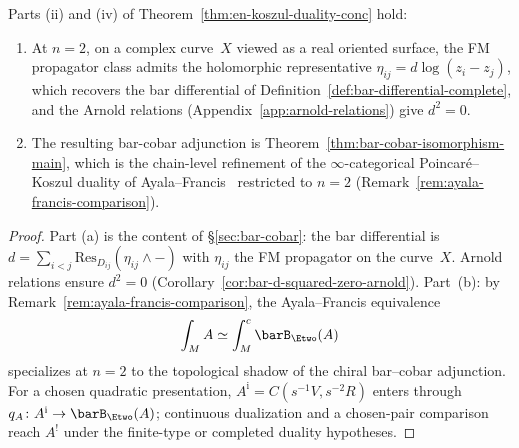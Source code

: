\begin{proposition}[\texorpdfstring{$n = 2$}{n = 2} recovery and AF comparison;
\ClaimStatusConditional]\label{prop:en-n2-recovery}
Parts \textup{(ii)} and \textup{(iv)} of
Theorem~\textup{\ref{thm:en-koszul-duality-conc}} hold:
\begin{enumerate}[label=\textup{(\alph*)}]
\item At $n = 2$, on a complex curve~$X$ viewed as a real oriented
 surface, the FM propagator class admits the holomorphic
 representative $\eta_{ij} = d\log(z_i - z_j)$, which
 recovers the bar differential of
 Definition~\textup{\ref{def:bar-differential-complete}},
 and the Arnold relations
 \textup{(}Appendix~\textup{\ref{app:arnold-relations})} give $d^2 = 0$.
\item The resulting bar-cobar adjunction is
 Theorem~\textup{\ref{thm:bar-cobar-isomorphism-main}},
 which is the chain-level refinement of the $\infty$-categorical
 Poincar\'e--Koszul duality of Ayala--Francis~\cite{AF15}
 restricted to $n = 2$
 \textup{(}Remark~\textup{\ref{rem:ayala-francis-comparison})}.
\end{enumerate}
\end{proposition}

\begin{proof}
Part (a) is the content of \S\ref{sec:bar-cobar}: the
bar differential is $d = \sum_{i < j} \mathrm{Res}_{D_{ij}}(\eta_{ij} \wedge -)$
with $\eta_{ij}$ the FM propagator on the curve~$X$. Arnold relations
ensure $d^2 = 0$ (Corollary~\ref{cor:bar-d-squared-zero-arnold}). Part~(b):
by Remark~\ref{rem:ayala-francis-comparison}, the Ayala--Francis
equivalence
\[
\int_M A \simeq \int_M^c \barB_{\Etwo}(A)
\]
specializes at $n = 2$ to the topological shadow of the chiral
bar--cobar adjunction.  For a chosen quadratic presentation,
$A^{\mathrm i}=C(s^{-1}V,s^{-2}R)$ enters through
$q_A\colon A^{\mathrm i}\to\barB_{\Etwo}(A)$; continuous dualization
and a chosen-pair comparison reach $A^!$ under the finite-type or
completed duality hypotheses.
\end{proof}

